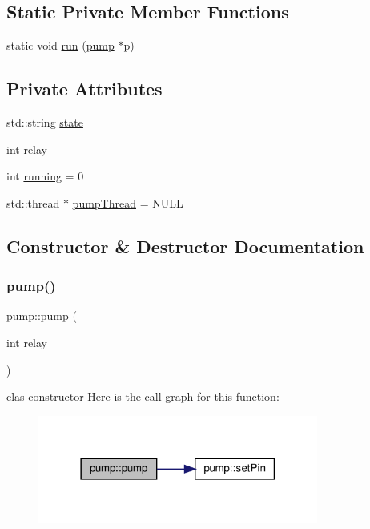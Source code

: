 \subsection*{Static Private Member Functions}
\begin{DoxyCompactItemize}
\item 
static void \hyperlink{classpump_a058e2690d8022501b5dfdc4ca646cb7c}{run} (\hyperlink{classpump}{pump} $\ast$p)
\end{DoxyCompactItemize}
\subsection*{Private Attributes}
\begin{DoxyCompactItemize}
\item 
std\+::string \hyperlink{classpump_ad96353945f20f718e8eba930fa8405ba}{state}
\item 
int \hyperlink{classpump_a31d0a2af60c2193f5e5a6e4e51c56ec6}{relay}
\item 
int \hyperlink{classpump_ad797d26b29fe1ebf7ad6f6590fb2c674}{running} = 0
\item 
std\+::thread $\ast$ \hyperlink{classpump_a52d8740c4bc37939ead02e93a6dfdb68}{pump\+Thread} = N\+U\+LL
\end{DoxyCompactItemize}


\subsection{Constructor \& Destructor Documentation}
\mbox{\label{classpump_a57d3d6b37505970fc9524064fdc46b96}} 
\subsubsection{\texorpdfstring{pump()}{pump()}}
{\footnotesize\ttfamily pump\+::pump (\begin{DoxyParamCaption}\item[{int}]{relay }\end{DoxyParamCaption})}

clas constructor Here is the call graph for this function\+:
\nopagebreak
\begin{figure}[H]
\begin{center}
\leavevmode
\includegraphics[width=261pt]{classpump_a57d3d6b37505970fc9524064fdc46b96_cgraph}
\end{center}
\end{figure}
\mbox{\label{classpump_a17a634b5d8443578744bbd4c9eff9d87}} 
